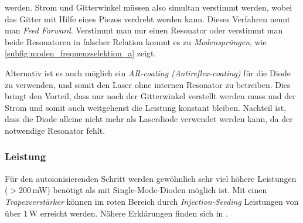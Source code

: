 werden. Strom und Gitterwinkel müssen also simultan verstimmt werden, wobei das
Gitter mit Hilfe eines Piezos verdreht werden kann. Dieses Verfahren nennt
man \textit{Feed Forward}. Verstimmt man nur einen Resonator oder verstimmt
man beide Resonatoren in falscher Relation kommt es zu
\textit{Modensprüngen}, wie \ref{subfig:moden_frequenzselektion_a} zeigt.\par
Alternativ ist es auch möglich ein \textit{AR-coating (Antireflex-coating)} für
die Diode zu verwenden, und somit den Laser ohne internen Resonator zu
betreiben.
Dies bringt den Vorteil, dass nur noch der Gitterwinkel verstellt werden muss
und der Strom und somit auch weitgehenst die Leistung konstant bleiben. Nachteil
ist, dass die Diode alleine nicht mehr als Laserdiode verwendet werden kann, da
der notwendige Resonator fehlt.

\subsubsection{Leistung}\label{subsubsec:diodenlaser_leistung}
Für den autoionisierenden Schritt werden gewöhnlich sehr viel höhere Leistungen
($>200\,$mW) benötigt als mit Single-Mode-Dioden möglich ist. Mit einen
\textit{Trapezverstärker} können im roten Bereich durch
\textit{Injection-Seeding} Leistungen von über $1\,$W erreicht werden. Nähere
Erklärungen finden sich in \cite{schumann:2001:diplomarbeit}.